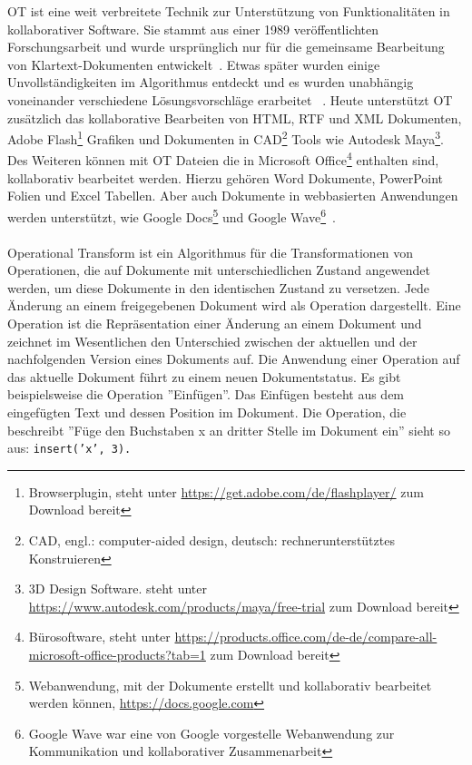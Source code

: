\def \maya { 3D Design Software. steht unter \url{https://www.autodesk.com/products/maya/free-trial} zum Download bereit}
\def \flash { Browserplugin, steht unter \url{https://get.adobe.com/de/flashplayer/} zum Download bereit}
\def \cad { CAD, engl.: computer-aided design, deutsch: rechnerunterstütztes Konstruieren}
\def \gdocs { Webanwendung, mit der Dokumente erstellt und kollaborativ bearbeitet werden können, \url{https://docs.google.com}}
\def \gwave { Google Wave war eine von Google vorgestelle Webanwendung zur Kommunikation und kollaborativer Zusammenarbeit}
\def \msoffice { Bürosoftware, steht unter \url{https://products.office.com/de-de/compare-all-microsoft-office-products?tab=1} zum Download bereit}
%
\gls{OT} ist eine weit verbreitete Technik zur Unterstützung von Funktionalitäten in \gls{kollaborativ}er Software.
Sie stammt aus einer 1989 veröffentlichten Forschungsarbeit und wurde ursprünglich nur für die gemeinsame Bearbeitung von Klartext-Dokumenten entwickelt~\cite{ot_paper}. Etwas später wurden einige Unvollständigkeiten im Algorithmus entdeckt und es wurden unabhängig voneinander verschiedene Lösungsvorschläge erarbeitet ~\cite{ot-later}.
Heute unterstützt \gls{OT} zusätzlich das \gls{kollaborativ}e Bearbeiten von \gls{HTML}, RTF und XML Dokumenten, Adobe Flash\footnote{\flash} Grafiken und Dokumenten in CAD\footnote{\cad} Tools wie Autodesk Maya\footnote{\maya}.
Des Weiteren können mit \gls{OT} Dateien die in Microsoft Office\footnote{\msoffice} enthalten sind, kollaborativ bearbeitet werden. Hierzu gehören Word Dokumente, PowerPoint Folien und Excel Tabellen.
Aber auch Dokumente in webbasierten Anwendungen werden unterstützt, wie Google Docs\footnote{\gdocs} und Google Wave\footnote{\gwave}~\cite{ot-faq}.\\\\
%
%
Operational Transform ist ein Algorithmus für die Transformationen von Operationen, die auf Dokumente mit unterschiedlichen Zustand angewendet werden, um diese Dokumente in den identischen Zustand zu versetzen.
Jede Änderung an einem freigegebenen Dokument wird als Operation dargestellt.
Eine Operation ist die Repräsentation einer Änderung an einem Dokument und zeichnet im Wesentlichen den Unterschied zwischen der aktuellen und der nachfolgenden Version eines Dokuments auf.
Die Anwendung einer Operation auf das aktuelle Dokument führt zu einem neuen Dokumentstatus.
Es gibt beispielsweise die Operation ''Einfügen''. 
Das Einfügen besteht aus dem eingefügten Text und dessen Position im Dokument. Die Operation, die beschreibt ''Füge den Buchstaben x an dritter Stelle im Dokument ein'' sieht so aus: \tt{insert('x', 3)}.
